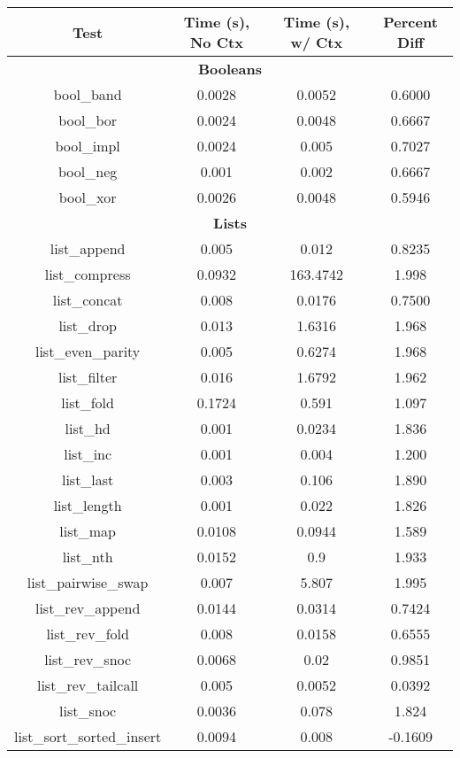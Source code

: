 \begin{table}
  \begin{center}
  \tabcolsep 5.8pt
  \footnotesize
  \begin{tabular}{cccc}
  \hline
  \textbf{Test} & \textbf{Time (s), No Ctx} & \textbf{Time (s), w/ Ctx} & \textbf{Percent Diff} \\
  \hline

\multicolumn{4}{c}{\textbf{Booleans}} \\
bool\_band & 0.0028 & 0.0052 & 0.6000 \\
bool\_bor & 0.0024 & 0.0048 & 0.6667 \\
bool\_impl & 0.0024 & 0.005 & 0.7027 \\
bool\_neg & 0.001 & 0.002 & 0.6667 \\
bool\_xor & 0.0026 & 0.0048 & 0.5946 \\
\multicolumn{4}{c}{\textbf{Lists}} \\
list\_append & 0.005 & 0.012 & 0.8235 \\
list\_compress & 0.0932 & 163.4742 & 1.998 \\
list\_concat & 0.008 & 0.0176 & 0.7500 \\
list\_drop & 0.013 & 1.6316 & 1.968 \\
list\_even\_parity & 0.005 & 0.6274 & 1.968 \\
list\_filter & 0.016 & 1.6792 & 1.962 \\
list\_fold & 0.1724 & 0.591 & 1.097 \\
list\_hd & 0.001 & 0.0234 & 1.836 \\
list\_inc & 0.001 & 0.004 & 1.200 \\
list\_last & 0.003 & 0.106 & 1.890 \\
list\_length & 0.001 & 0.022 & 1.826 \\
list\_map & 0.0108 & 0.0944 & 1.589 \\
list\_nth & 0.0152 & 0.9 & 1.933 \\
list\_pairwise\_swap & 0.007 & 5.807 & 1.995 \\
list\_rev\_append & 0.0144 & 0.0314 & 0.7424 \\
list\_rev\_fold & 0.008 & 0.0158 & 0.6555 \\
list\_rev\_snoc & 0.0068 & 0.02 & 0.9851 \\
list\_rev\_tailcall & 0.005 & 0.0052 & 0.0392 \\
list\_snoc & 0.0036 & 0.078 & 1.824 \\
list\_sort\_sorted\_insert & 0.0094 & 0.008 & -0.1609 \\

\end{tabular}
\end{center}
\end{table}
